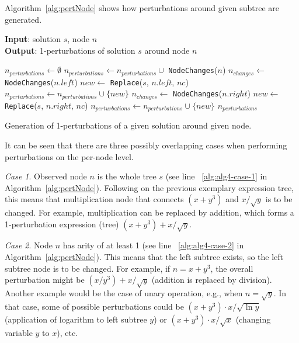 \documentclass[a4paper,12pt]{elsarticle}
\begin{document}
Algorithm~\ref{alg:pertNode} shows how perturbations around given subtree are generated.

\begin{algorithm}	
	\hspace*{\algorithmicindent} \textbf{Input}: solution $s$, node $n$\\
	\hspace*{\algorithmicindent} \textbf{Output}: 1-perturbations of solution $s$ around node $n$
	\begin{algorithmic}[1]
		\State $n_{perturbations} \gets \emptyset$
		 \label{alg:alg4-case-1}
		\State $n_{perturbations} \gets n_{perturbations} \cup$ \texttt{NodeChanges}($n$)
		\EndIf
		\label{alg:alg4-case-2}
		\State $n_{changes} \gets$ \texttt{NodeChanges}($n.left$)
		\State $new \gets$ \texttt{Replace}($s$, $n.left$, $nc$)
		\State $n_{perturbations} \gets n_{perturbations} \cup \{new\}$
		\EndFor
		\EndIf
		\label{alg:alg4-case-3}
		\State $n_{changes} \gets$ \texttt{NodeChanges}($n.right$)
		\State $new \gets$ \texttt{Replace}($s$, $n.right$, $nc$)
		\State $n_{perturbations} \gets n_{perturbations} \cup \{new\}$
		\EndFor
		\EndIf
		\State \Return $n_{perturbations}$
		\EndProcedure
	\end{algorithmic}
	\caption{Generation of 1-perturbations of a given solution around given node.}
	\label{alg:pertNode}
\end{algorithm}

It can be seen that there are three possibly overlapping cases when performing perturbations on the per-node level. 

\emph{Case 1}. 
Observed node $n$ is the whole tree $s$ (see line ~\ref{alg:alg4-case-1} in Algorithm~\ref{alg:pertNode}). Following on  the previous exemplary expression tree, this means that multiplication node that connects $(x+y^3)$ and $x/\sqrt{y}$ is to be changed. For example, multiplication can be replaced by addition, which forms a 1-perturbation expression (tree) $(x+y^3)+ x/\sqrt{y}$. 


\emph{Case 2}. 
Node $n$ has arity of at least 1 (see line ~\ref{alg:alg4-case-2} in Algorithm~\ref{alg:pertNode}). This means that the left subtree exists, so the left subtree node is to be changed. 
For example, if $n=x+y^3$, the overall perturbation might be $(x/y^3)+x/\sqrt{y}$ (addition is replaced by division). 
Another example would be the case of unary operation, e.g., when $n=\sqrt{y}$. In that case, some of possible perturbations could be $(x+y^3)\cdot x/\sqrt{\ln{y}}$ (application of logarithm to left subtree $y$) or $(x+y^3)\cdot x/\sqrt{x}$ (changing variable $y$ to $x$), etc.
\end{document}
